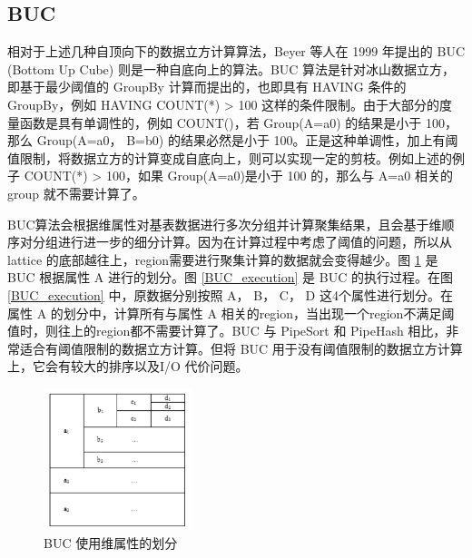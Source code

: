 
\subsection{BUC}

相对于上述几种自顶向下的数据立方计算算法，Beyer 等人在 1999 年提出的 BUC (Bottom Up Cube) 则是一种自底向上的算法。BUC 算法是针对冰山数据立方，即基于最少阈值的 GroupBy 计算而提出的，也即具有 HAVING 条件的 GroupBy，例如 HAVING COUNT(*) > 100 这样的条件限制。由于大部分的度量函数是具有单调性的，例如 COUNT()，若 Group(A=a0) 的结果是小于 100，那么 Group(A=a0， B=b0) 的结果必然是小于 100。正是这种单调性，加上有阈值限制，将数据立方的计算变成自底向上，则可以实现一定的剪枝。例如上述的例子 COUNT(*) > 100，如果 Group(A=a0)是小于 100 的，那么与 A=a0 相关的 group 就不需要计算了。

BUC算法会根据维属性对基表数据进行多次分组并计算聚集结果，且会基于维顺序对分组进行进一步的细分计算。因为在计算过程中考虑了阈值的问题，所以从 lattice 的底部越往上，region需要进行聚集计算的数据就会变得越少。图 \ref{BUC_partition} 是 BUC 根据属性 A 进行的划分。图 \ref{BUC_execution} 是 BUC 的执行过程。在图 \ref{BUC_execution} 中，原数据分别按照 A， B， C， D 这4个属性进行划分。在属性 A 的划分中，计算所有与属性 A 相关的region，当出现一个region不满足阈值时，则往上的region都不需要计算了。BUC 与 PipeSort 和 PipeHash 相比，非常适合有阈值限制的数据立方计算。但将 BUC 用于没有阈值限制的数据立方计算上，它会有较大的排序以及I/O 代价问题。

\begin{figure}[!htb]
\centering\includegraphics[width=1.7in]{picture/ch_current_research/BUC_partition} 
\caption{BUC 使用维属性的划分}\label{BUC_partition} 
\end{figure} 


